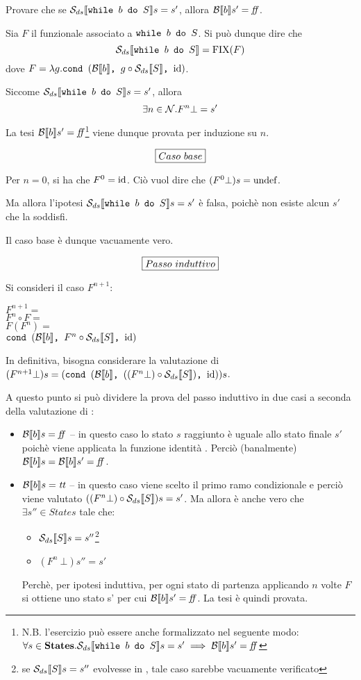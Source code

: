 {
  Provare che se $\dsCtxt{\wbS{b}{S}} s = s'$, allora $\B{b}' = \semfalse$.
}
{
}

Sia $F$ il funzionale associato a $\wbS{b}{S}$. Si può dunque dire che
$$
\dsCtxt{\wbS{b}{S}} = \fixp{F}
$$
dove $F = \lambda{g}.\cond{b}{g \circ \dsCtxt{S}}{\idDS}$.

Siccome $\dsCtxt{\wbS{b}{S}} s = s'$, allora
$$
\exists{n}\in\Ncal. F^n \bot = s'
$$

La tesi $\B{b}' = \semfalse$\footnote{N.B. l'esercizio può essere anche
formalizzato nel seguente modo:
$\forall{s\in\states}.\dsCtxt{\wbS{b}{S}} s = s' \implies \B{b}' = \semfalse$} 
viene dunque provata per induzione su $n$.

$$
\boxer{Caso\ base}
$$

Per $n = 0$, si ha che $F^0 = \idDS$. Ciò vuol dire che
$(F^0 \bot) s = \undefDS$.

Ma allora l'ipotesi $\dsCtxt{\wbS{b}{S}} s = s'$ è falsa,
poichè non esiste alcun $s'$ che la soddisfi.

Il caso base è dunque vacuamente vero.

$$
\boxer{Passo\ induttivo}
$$

Si consideri il caso $F^{n+1}$:
\vspace{.5em}

\noindent $F^{n+1} =$ \\
\noindent $F^n \circ F =$ \\
\noindent $F(F^n) =$ \\
\noindent $\cond{b}{F^n \circ \dsCtxt{S}}{\idDS}$
\vspace{.5em}

In definitiva, bisogna considerare la valutazione di
$(F^{n+1} \bot) s = (\cond{b}{((F^n \bot) \circ \dsCtxt{S})}{\idDS}) s$.

A questo punto si può dividere la prova del passo induttivo in due casi a
seconda della valutazione di :
\begin{itemize}
  \item $\B{b} = \semfalse$ -- in questo caso lo stato $s$ raggiunto è uguale
    allo stato finale $s'$ poichè viene applicata la funzione identità \idDS{}.
    Perciò (banalmente) $\B{b} = \B{b}' = \semfalse$.
  \item $\B{b} = \semtrue$ -- in questo caso viene scelto il primo ramo
    condizionale e perciò viene valutato $((F^n \bot) \circ \dsCtxt{S}) s = s'$.
    Ma allora è anche vero che $\exists s'' \in States$ tale che:
    \begin{itemize}
      \item $\dsCtxt{S} s = s''$\footnote{se $\dsCtxt{S} s = s''$ evolvesse in
    \undefDS, tale caso sarebbe vacuamente verificato}
      \item $(F^n\ \bot) s'' = s'$
    \end{itemize}
     Perchè, per ipotesi induttiva, per ogni stato di partenza applicando $n$
   volte $F$ si ottiene uno stato s' per cui $\B{b}' = \semfalse$. La tesi 
   è quindi provata.
\end{itemize}
